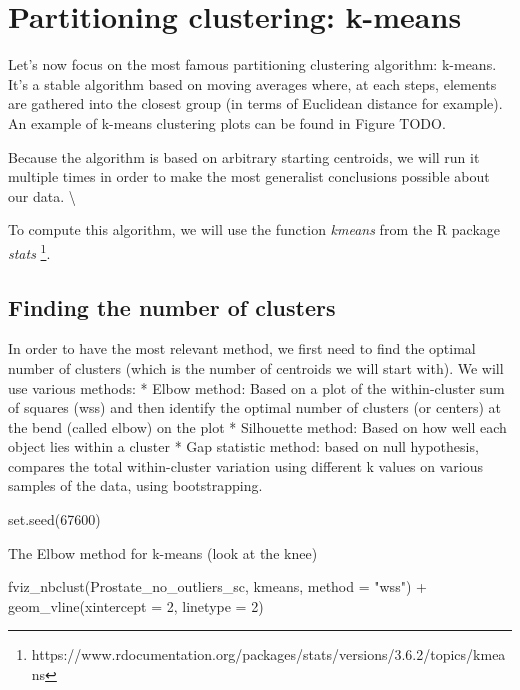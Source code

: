 \documentclass[
]{article}
\newenvironment{Shaded}{\begin{snugshade}}{\end{snugshade}}
\newcommand{\AttributeTok}[1]{\textcolor[rgb]{0.77,0.63,0.00}{#1}}
\newcommand{\DecValTok}[1]{\textcolor[rgb]{0.00,0.00,0.81}{#1}}
\newcommand{\FunctionTok}[1]{\textcolor[rgb]{0.00,0.00,0.00}{#1}}
\newcommand{\NormalTok}[1]{#1}
\newcommand{\SpecialCharTok}[1]{\textcolor[rgb]{0.00,0.00,0.00}{#1}}
\newcommand{\StringTok}[1]{\textcolor[rgb]{0.31,0.60,0.02}{#1}}
\begin{document}
\hypertarget{partitioning-clustering-k-means}{%
\section{Partitioning clustering:
k-means}\label{partitioning-clustering-k-means}}

Let's now focus on the most famous partitioning clustering algorithm:
k-means. It's a stable algorithm based on moving averages where, at each
steps, elements are gathered into the closest group (in terms of
Euclidean distance for example). An example of k-means clustering plots
can be found in Figure TODO.

Because the algorithm is based on arbitrary starting centroids, we will
run it multiple times in order to make the most generalist conclusions
possible about our data. \textbackslash{}

To compute this algorithm, we will use the function \emph{kmeans} from
the R package \emph{stats}
\footnote{https://www.rdocumentation.org/packages/stats/versions/3.6.2/topics/kmeans}.

\hypertarget{finding-the-number-of-clusters}{%
\subsection{Finding the number of
clusters}\label{finding-the-number-of-clusters}}

In order to have the most relevant method, we first need to find the
optimal number of clusters (which is the number of centroids we will
start with). We will use various methods: * Elbow method: Based on a
plot of the within-cluster sum of squares (wss) and then identify the
optimal number of clusters (or centers) at the bend (called elbow) on
the plot * Silhouette method: Based on how well each object lies within
a cluster * Gap statistic method: based on null hypothesis, compares the
total within-cluster variation using different k values on various
samples of the data, using bootstrapping.

\begin{Shaded}
\begin{Highlighting}[]
\FunctionTok{set.seed}\NormalTok{(}\DecValTok{67600}\NormalTok{)}
\end{Highlighting}
\end{Shaded}

The Elbow method for k-means (look at the knee)

\begin{Shaded}
\begin{Highlighting}[]
\FunctionTok{fviz\_nbclust}\NormalTok{(Prostate\_no\_outliers\_sc, kmeans, }\AttributeTok{method =} \StringTok{"wss"}\NormalTok{) }\SpecialCharTok{+}
\FunctionTok{geom\_vline}\NormalTok{(}\AttributeTok{xintercept =} \DecValTok{2}\NormalTok{, }\AttributeTok{linetype =} \DecValTok{2}\NormalTok{)}
\end{Highlighting}
\end{Shaded}
\end{document}

